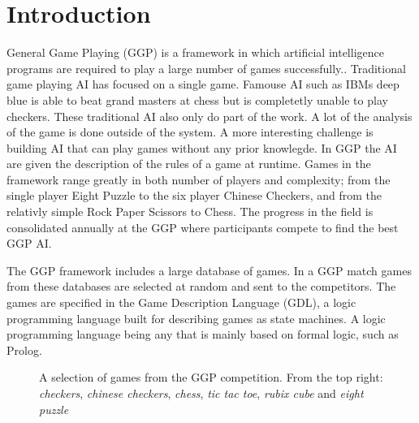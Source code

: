 
\chapter{Introduction}
General Game Playing (GGP) is a framework in which artificial intelligence programs are required to play a large number of games successfully.\cite{Genesereth/GGPOverview}. Traditional game playing AI has focused on a single game. Famouse AI such as IBMs deep blue is able to beat grand masters at chess but is completetly unable to play checkers. These traditional AI also only do part of the work. A lot of the analysis of the game is done outside of the system. A more interesting challenge is building AI that can play games without any prior knowlegde. In GGP the AI are given the description of the rules of a game at runtime. Games in the framework range greatly in both number of players and complexity; from the single player Eight Puzzle to the six player Chinese Checkers, and from the relativly simple Rock Paper Scissors to Chess\cite{GGP-Website}. The progress in the field is consolidated annually at the GGP where participants compete to find the best GGP AI. 

The GGP framework includes a large database of games. In a GGP match games from these databases are selected at random and sent to the competitors. The games are specified in the Game Description Language (GDL), a logic programming language built for describing games as state machines\cite{GDL_Spec}. A logic programming language being any that is mainly based on formal logic, such as Prolog.


\begin{figure}[ht]
	\centering
	\caption{A selection of games from the GGP competition. From the top right: \textit{checkers}, \textit{chinese checkers}, \textit{chess}, \textit{tic tac toe}, \textit{rubix cube} and \textit{eight puzzle}}
\end{figure}

